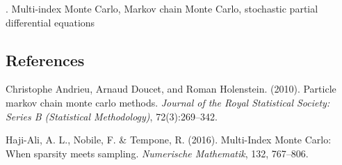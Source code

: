 \documentclass[10.9pt]{article}
\begin{document}
.
Multi-index Monte Carlo, Markov chain Monte Carlo, stochastic partial differential equations


%        
%
%        

\subsection*{References}

\begin{description}
\item
Christophe Andrieu, Arnaud Doucet, and Roman Holenstein. (2010).
Particle markov chain monte carlo methods.
\textit{Journal of the Royal Statistical Society: Series B (Statistical Methodology)}, 72(3):269--342.

\item
Haji-Ali, A. L., Nobile, F. \& Tempone, R. (2016).
Multi-Index Monte Carlo: When sparsity meets sampling.
\textit{Numerische Mathematik}, 132, 767--806.
\end{description}
\end{document}
